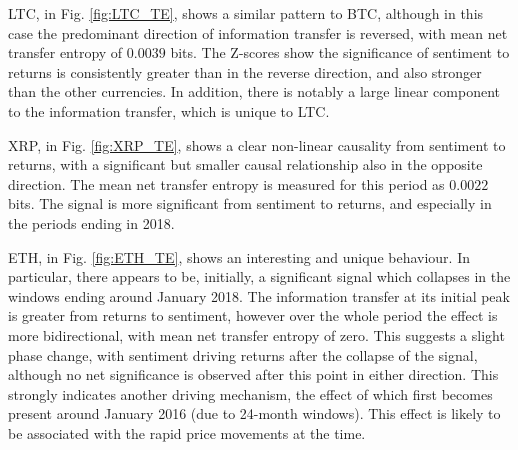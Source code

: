 \documentclass[]{rsos}%
\begin{document}
  LTC, in Fig. \ref{fig:LTC_TE}, shows a similar pattern to BTC, although in this case the predominant direction of information transfer is reversed, with mean net transfer entropy of $0.0039$ bits. The Z-scores show the significance of sentiment to {\color{blue} returns} is consistently greater than in the reverse direction, and also stronger than the other currencies. In addition, there is notably a large linear component to the information transfer, which is unique to LTC. 

  XRP, in Fig. \ref{fig:XRP_TE}, shows a clear non-linear causality from sentiment to {\color{blue} returns}, with a significant but smaller causal relationship also in the opposite direction. The mean net transfer entropy is measured for this period as $0.0022$ bits. The signal is more significant from sentiment to {\color{blue} returns}, and especially in the periods ending in 2018. 
  
  ETH, in Fig. \ref{fig:ETH_TE}, shows an interesting and unique behaviour. In particular, there appears to be, initially, a significant signal which collapses in the windows ending around January 2018. The information transfer at its initial peak is greater from {\color{blue} returns} to sentiment, however over the whole period the effect is more bidirectional, with mean net transfer entropy of zero. This suggests a slight phase change, with sentiment driving {\color{blue} returns} after the collapse of the signal, although no net significance is observed after this point in either direction. This strongly indicates another driving mechanism, the effect of which first becomes present around January 2016 (due to 24-month windows). This effect is likely to be associated with the rapid price movements at the time.  %
  
\end{document}
